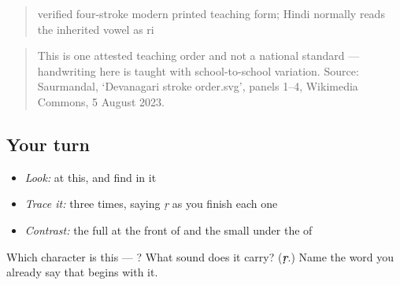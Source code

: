 \begin{quote}
verified four-stroke modern printed teaching form; Hindi normally reads the inherited vowel as ri
\end{quote}

\begin{quote}
This is one attested teaching order and not a national standard — handwriting here is taught with school-to-school variation. Source: Saurmandal, ‘Devanagari  stroke order.svg’, panels 1–4, Wikimedia Commons, 5 August 2023.
\end{quote}

\subsection*{Your turn}
\begin{itemize}
\raggedright
  \item \emph{Look:} at this, and find  in it
\end{itemize}

\begin{quote}
\end{quote}

\begin{itemize}
\raggedright
  \item \emph{Trace it:}  three times, saying \emph{ṛ} as you finish each one
  \item \emph{Contrast:} the full \textbf{} at the front of \textbf{} and the small \textbf{} under the \textbf{} of \textbf{}
\end{itemize}

\begin{tcolorbox}[breakable,colback=teal!4,colframe=teal!35!black,title={Before you move on}]
Which character is this — ? What sound does it carry? (\emph{\textbf{ṛ}}.) Name the word you already say that begins with it.
\end{tcolorbox}

